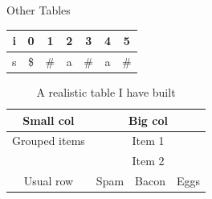 \begin{frame}{Other Tables}

	\begin{tabular}{ccccccc}
		\hline
		i & 0  & 1  & 2 & 3  & 4 & 5  \\
		\hline
		s & \$ & \# & a & \# & a & \# \\
		\hline
	\end{tabular}

	\begin{table}
		\caption{A realistic table I have built}
		\label{tab:table}
		\begin{tabular}{|c||ccc|}
			\hline \hline
			Small col     & \multicolumn{3}{|c|}{Big col}                \\
			\hline
			Grouped items & \multicolumn{3}{|c|}{Item 1}                 \\
			\cline{2-4}
			              & \multicolumn{3}{|c|}{Item 2}                 \\
			\hline
			Usual row     & Spam                          & Bacon & Eggs \\
			\hline\hline
		\end{tabular}
	\end{table}

\end{frame}
